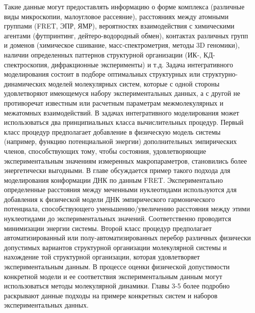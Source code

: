 Такие данные могут предоставлять информацию о форме комплекса (различные виды микроскопии, малоугловое рассеяние), расстояниях между атомными группами (FRET, ЭПР, ЯМР), вероятностях взаимодействия с химическими агентами (футпринтинг, дейтеро-водородный обмен), контактах различных групп и доменов (химическое сшивание, масс-спектрометрия, методы 3D геномики), наличии определенных паттернов структурной организации (ИК-, КД-спектроскопия, дифракционные эксперименты) и т.д. Задача интегративного моделирования состоит в подборе оптимальных структурных или структурно-динамических моделей молекулярных систем, которые с одной стороны удовлетворяют имеющемуся набору экспериментальных данных, а с другой не противоречат известным или расчетным параметрам межмолекулярных и межатомных взаимодействий. 
В задачах интегративного моделирования может использоваться два принципиальных класса вычислительных процедур. Первый класс процедур предполагает добавление в физическую модель системы (например, функцию потенциальной энергии) дополнительных эмпирических членов, способствующих тому, чтобы состояния, удовлетворяющие экспериментальным значениям измеренных макропараметров, становились более энергетически выгодными.  В главе обсуждается пример такого подхода для моделирования конформации ДНК по данным FRET. Экспериментально определенные расстояния между меченными нуклеотидами используются для добавления к физической модели ДНК эмпирического гармонического потенциала, способствующего уменьшению/увеличению расстояния между этими нуклеотидами до экспериментальных значений. Соответственно проводится минимизации энергии системы. Второй класс процедур предполагает автоматизированный или полу-автоматизированных перебор различных физически допустимых вариантов структурной организации молекулярной системы и нахождение той структурной организации, которая удовлетворяет экспериментальным данным. В процессе оценки физической допустимости конкретной модели и ее соответствия экспериментальным данным могут использоваться методы молекулярной динамики. Главы 3-5 более подробно раскрывают данные подходы на примере конкретных систем и наборов экспериментальных данных.


